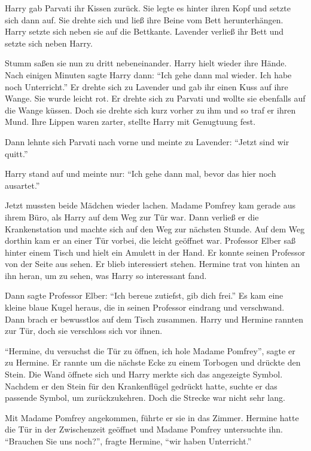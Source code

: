 Harry gab Parvati ihr Kissen zurück. Sie legte es hinter ihren Kopf und setzte sich dann auf. Sie drehte sich und ließ ihre Beine vom Bett herunterhängen. Harry setzte sich neben sie auf die Bettkante. Lavender verließ ihr Bett und setzte sich neben Harry.

Stumm saßen sie nun zu dritt nebeneinander. Harry hielt wieder ihre Hände. Nach einigen Minuten sagte Harry dann: \enquote{Ich gehe dann mal wieder. Ich habe noch Unterricht.} Er drehte sich zu Lavender und gab ihr einen Kuss auf ihre Wange. Sie wurde leicht rot. Er drehte sich zu Parvati und wollte sie ebenfalls auf die Wange küssen. Doch sie drehte sich kurz vorher zu ihm und so traf er ihren Mund. Ihre Lippen waren zarter, stellte Harry mit Genugtuung fest.

Dann lehnte sich Parvati nach vorne und meinte zu Lavender: \enquote{Jetzt sind wir quitt.}

Harry stand auf und meinte nur: \enquote{Ich gehe dann mal, bevor das hier noch ausartet.}

Jetzt mussten beide Mädchen wieder lachen. Madame Pomfrey kam gerade aus ihrem Büro, als Harry auf dem Weg zur Tür war. Dann verließ er die Krankenstation und machte sich auf den Weg zur nächsten Stunde. Auf dem Weg dorthin kam er an einer Tür vorbei, die leicht geöffnet war. Professor Elber saß hinter einem Tisch und hielt ein Amulett in der Hand. Er konnte seinen Professor von der Seite aus sehen. Er blieb interessiert stehen. Hermine trat von hinten an ihn heran, um zu sehen, was Harry so interessant fand.

Dann sagte Professor Elber: \enquote{Ich bereue zutiefst, gib dich frei.} Es kam eine kleine blaue Kugel heraus, die in seinen Professor eindrang und verschwand. Dann brach er bewusstlos auf dem Tisch zusammen. Harry und Hermine rannten zur Tür, doch sie verschloss sich vor ihnen.

\enquote{Hermine, du versuchst die Tür zu öffnen, ich hole Madame Pomfrey}, sagte er zu Hermine. Er rannte um die nächste Ecke zu einem Torbogen und drückte den Stein. Die Wand öffnete sich und Harry merkte sich das angezeigte Symbol. Nachdem er den Stein für den Krankenflügel gedrückt hatte, suchte er das passende Symbol, um zurückzukehren. Doch die Strecke war nicht sehr lang.

Mit Madame Pomfrey angekommen, führte er sie in das Zimmer. Hermine hatte die Tür in der Zwischenzeit geöffnet und Madame Pomfrey untersuchte ihn. \enquote{Brauchen Sie uns noch?}, fragte Hermine, \enquote{wir haben Unterricht.}

